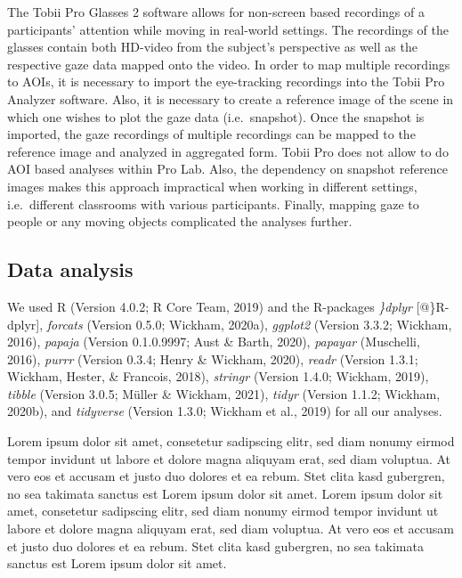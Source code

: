 \documentclass[
  english,
  man,floatsintext]{apa6}
\begin{document}
The Tobii Pro Glasses 2 software allows for non-screen based recordings of a participants' attention while moving in real-world settings. The recordings of the glasses contain both HD-video from the subject's perspective as well as the respective gaze data mapped onto the video. In order to map multiple recordings to AOIs, it is necessary to import the eye-tracking recordings into the Tobii Pro Analyzer software. Also, it is necessary to create a reference image of the scene in which one wishes to plot the gaze data (i.e.~snapshot). Once the snapshot is imported, the gaze recordings of multiple recordings can be mapped to the reference image and analyzed in aggregated form. Tobii Pro does not allow to do AOI based analyses within Pro Lab. Also, the dependency on snapshot reference images makes this approach impractical when working in different settings, i.e.~different classrooms with various participants. Finally, mapping gaze to people or any moving objects complicated the analyses further.

\hypertarget{data-analysis}{%
\subsection{Data analysis}\label{data-analysis}}

We used R (Version 4.0.2; R Core Team, 2019) and the R-packages \emph{\}dplyr} {[}@\}R-dplyr{]}, \emph{forcats} (Version 0.5.0; Wickham, 2020a), \emph{ggplot2} (Version 3.3.2; Wickham, 2016), \emph{papaja} (Version 0.1.0.9997; Aust \& Barth, 2020), \emph{papayar} (Muschelli, 2016), \emph{purrr} (Version 0.3.4; Henry \& Wickham, 2020), \emph{readr} (Version 1.3.1; Wickham, Hester, \& Francois, 2018), \emph{stringr} (Version 1.4.0; Wickham, 2019), \emph{tibble} (Version 3.0.5; Müller \& Wickham, 2021), \emph{tidyr} (Version 1.1.2; Wickham, 2020b), and \emph{tidyverse} (Version 1.3.0; Wickham et al., 2019) for all our analyses.

Lorem ipsum dolor sit amet, consetetur sadipscing elitr, sed diam nonumy eirmod tempor invidunt ut labore et dolore magna aliquyam erat, sed diam voluptua. At vero eos et accusam et justo duo dolores et ea rebum. Stet clita kasd gubergren, no sea takimata sanctus est Lorem ipsum dolor sit amet. Lorem ipsum dolor sit amet, consetetur sadipscing elitr, sed diam nonumy eirmod tempor invidunt ut labore et dolore magna aliquyam erat, sed diam voluptua. At vero eos et accusam et justo duo dolores et ea rebum. Stet clita kasd gubergren, no sea takimata sanctus est Lorem ipsum dolor sit amet.
\end{document}
